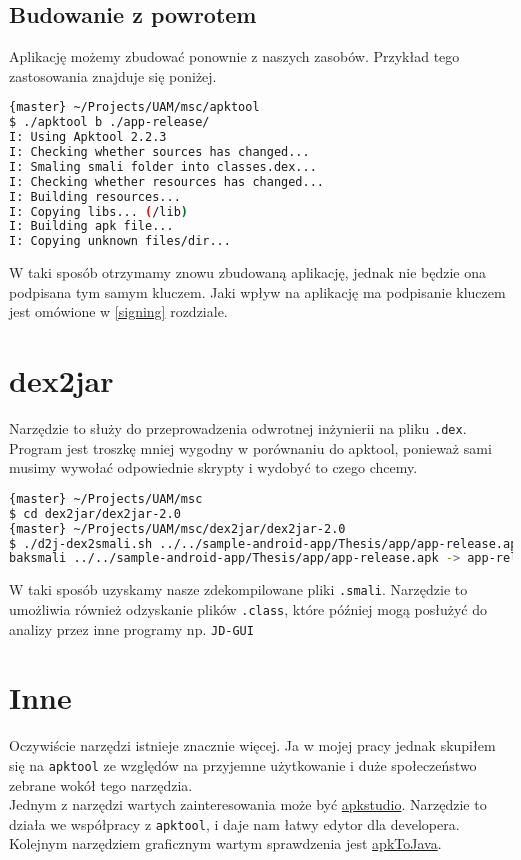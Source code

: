 \documentclass[12pt,a4paper,leqno,oneside,titlepage]{book}
\begin{document}
\subsection{Budowanie z powrotem}
Aplikację możemy zbudować ponownie z naszych zasobów. Przykład tego zastosowania znajduje się poniżej.

\begin{lstlisting}[language=bash]
{master} ~/Projects/UAM/msc/apktool
$ ./apktool b ./app-release/
I: Using Apktool 2.2.3
I: Checking whether sources has changed...
I: Smaling smali folder into classes.dex...
I: Checking whether resources has changed...
I: Building resources...
I: Copying libs... (/lib)
I: Building apk file...
I: Copying unknown files/dir...
\end{lstlisting}
W taki sposób otrzymamy znowu zbudowaną aplikację, jednak nie będzie ona podpisana tym samym kluczem. Jaki wpływ na aplikację ma podpisanie kluczem jest omówione w \ref{signing} rozdziale.

\section{dex2jar}
Narzędzie to służy do przeprowadzenia odwrotnej inżynierii na pliku \lstinline|.dex|. Program jest troszkę mniej wygodny w porównaniu do apktool, ponieważ sami musimy wywołać odpowiednie skrypty i wydobyć to czego chcemy.

\begin{lstlisting}[language=bash]
{master} ~/Projects/UAM/msc
$ cd dex2jar/dex2jar-2.0
{master} ~/Projects/UAM/msc/dex2jar/dex2jar-2.0
$ ./d2j-dex2smali.sh ../../sample-android-app/Thesis/app/app-release.apk
baksmali ../../sample-android-app/Thesis/app/app-release.apk -> app-release-out
\end{lstlisting}
W taki sposób uzyskamy nasze zdekompilowane pliki \verb|.smali|. Narzędzie to umożliwia również odzyskanie plików \verb|.class|, które później mogą posłużyć do analizy przez inne programy np. \verb|JD-GUI|
%
\section{Inne}
Oczywiście narzędzi istnieje znacznie więcej. Ja w mojej pracy jednak skupiłem się na \verb|apktool| ze względów na przyjemne użytkowanie i duże społeczeństwo zebrane wokół tego narzędzia.\\
Jednym z narzędzi wartych zainteresowania może być \href{http://vaibhavpandey.com/apkstudio/}{apkstudio}. Narzędzie to działa we współpracy z \verb|apktool|, i daje nam łatwy edytor dla developera.\\
Kolejnym narzędziem graficznym wartym sprawdzenia jest \href{https://github.com/ajitsing/apkToJava}{apkToJava}.
\end{document}
